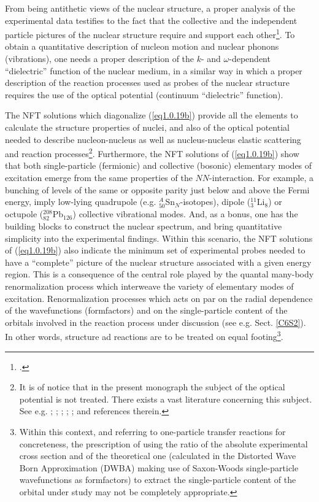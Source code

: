 From being antithetic views of the nuclear structure, a proper analysis of the experimental data testifies to the fact that the collective and the independent particle pictures of the nuclear structure require and support each other\footnote{\cite{Bohr:75}.}. To obtain a quantitative description of nucleon  motion and nuclear phonons (vibrations), one needs a proper description of the $k$- and $\omega$-dependent ``dielectric'' function of the nuclear medium, in a similar way in which a proper description of the reaction processes used as probes of the nuclear structure requires the use of the optical potential (continuum ``dielectric'' function). 


The NFT solutions which diagonalize  (\ref{eq1.0.19b}) provide all the elements to calculate the structure properties of nuclei, and also of the optical potential needed to describe nucleon-nucleus as well as nucleus-nucleus elastic scattering and reaction processes\footnote{\label{f21c1} It is of notice that in the present monograph the subject of the optical potential is not treated.  There exists a vast literature concerning this subject. See e.g. \cite{Feshbach:58,Feshbach:62,Jackson:70,Jeukenne:76,Sartor:80,Pollarolo:83,Satchler:83,Broglia:04a,Dickhoff:05,Montanari:14,Dickhoff:17}; \cite{Dickhoff:19};  \cite{Fernandez:10}; \cite{Fernandez:10b}; \cite{Jenning:11};  \cite{Barbieri:05,Rotureau:17,Broglia:81b} and references therein.}.
Furthermore, the NFT solutions of (\ref{eq1.0.19b}) show that both single-particle (fermionic) and collective (bosonic) elementary modes of excitation emerge from the same properties of the $NN$-interaction. For example, a bunching of levels of the same or opposite parity just below and above the Fermi energy, imply low-lying quadrupole (e.g. $^A_{50}$Sn$_{N}$-isotopes), dipole ($^{11}_3$Li$_8$) or octupole ($^{208}_{82}$Pb$_{126}$) collective vibrational modes. And, as a bonus, one has the building blocks to construct the nuclear spectrum, and bring quantitative simplicity into the experimental findings. Within this scenario, the NFT solutions of (\ref{eq1.0.19b}) also indicate the minimum set of experimental probes needed to have a ``complete'' picture of the nuclear structure associated with a given energy region. This is a consequence of the central role played by the quantal many-body renormalization process which interweave the variety of elementary modes of excitation.
Renormalization processes which acts on par on the radial dependence of the wavefunctions (formfactors) and on the single-particle content of the orbitals involved in the reaction process under discussion (see e.g. Sect. \ref{C6S2}). In other words, structure ad reactions are to be treated on equal footing\footnote{Within this context, and referring to one-particle transfer reactions for concreteness, the prescription of using the ratio of the absolute experimental cross section  and of the theoretical one (calculated in the Distorted Wave Born Approximation (DWBA) making use of Saxon-Woods single-particle wavefunctions as formfactors) to extract the single-particle content of the orbital under study may not be completely appropriate.}. 


